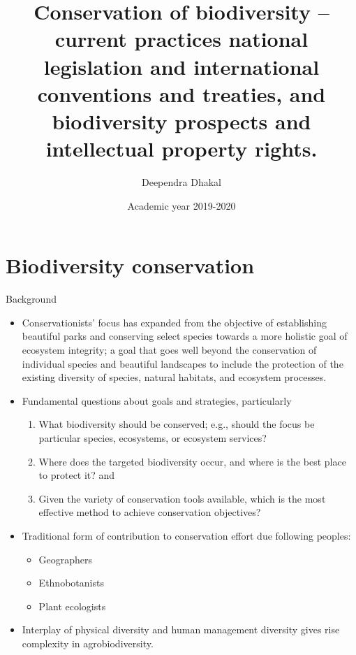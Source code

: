 \documentclass[ignorenonframetext,aspectratio=169]{beamer}
\title{Conservation of biodiversity -- current practices national legislation
and international conventions and treaties, and biodiversity prospects
and intellectual property rights.}
\author{Deependra Dhakal}
\institute{GAASC, Baitadi \and Tribhuwan University}
\date{Academic year 2019-2020}
\providecommand{\tightlist}{%
  \setlength{\itemsep}{0pt}\setlength{\parskip}{0pt}}
\begin{document}
\frame{\titlepage}

\begin{frame}
\tableofcontents[hideallsubsections]
\end{frame}
\hypertarget{biodiversity-conservation}{%
\section{Biodiversity conservation}\label{biodiversity-conservation}}

\begin{frame}{Background}
\protect\hypertarget{background}{}

\begin{itemize}
\tightlist
\item
  Conservationists' focus has expanded from the objective of
  establishing beautiful parks and conserving select species towards a
  more holistic goal of ecosystem integrity; a goal that goes well
  beyond the conservation of individual species and beautiful landscapes
  to include the protection of the existing diversity of species,
  natural habitats, and ecosystem processes.
\item
  Fundamental questions about goals and strategies, particularly

  \begin{enumerate}
  \tightlist
  \item
    What biodiversity should be conserved; e.g., should the focus be
    particular species, ecosystems, or ecosystem services?
  \item
    Where does the targeted biodiversity occur, and where is the best
    place to protect it? and
  \item
    Given the variety of conservation tools available, which is the most
    effective method to achieve conservation objectives?
  \end{enumerate}
\item
  Traditional form of contribution to conservation effort due following
  peoples:

  \begin{itemize}
  \tightlist
  \item
    Geographers
  \item
    Ethnobotanists
  \item
    Plant ecologists
  \end{itemize}
\item
  Interplay of physical diversity and human management diversity gives
  rise complexity in agrobiodiversity.
\end{itemize}

\end{frame}
\end{document}
